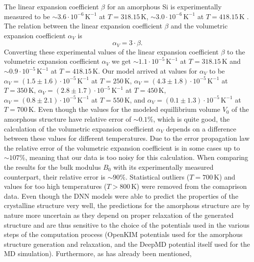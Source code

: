 The linear expansion coefficient $\beta$ for an amorphous Si is experimentally
measured to be $\sim 3.6 \cdot 10^{-6} \, \mathrm{K}^{-1}$ at
$T = 318.15 \, \mathrm{K}$, $\sim 3.0 \cdot 10^{-6} \, \mathrm{K}^{-1}$ at
$T = 418.15 \, \mathrm{K}$ \cite{TAKIMOTO2002314}. The relation between the
linear expansion coefficient $\beta$ and the volumetric expansion coefficient
$\alpha_V$ is
\begin{equation}
  \alpha_V = 3 \cdot \beta.
\end{equation}
Converting these experimental values of the linear expansion coefficient $\beta$ to the
volumetric expansion coefficient $\alpha_V$ we get
$\sim 1.1 \cdot 10^{-5} \, \mathrm{K}^{-1}$ at $T = 318.15 \, \mathrm{K}$ and
$\sim 0.9 \cdot 10^{-5} \, \mathrm{K}^{-1}$ at $T = 418.15 \, \mathrm{K}$.
Our model arrived at values for $\alpha_V$ to be
$\alpha_V = (1.5 \pm 1.6) \cdot 10^{-5} \, \mathrm{K}^{-1}$ at $T = 250 \, \mathrm{K}$,
$\alpha_V = (4.3 \pm 1.8) \cdot 10^{-5} \, \mathrm{K}^{-1}$ at $T = 350 \, \mathrm{K}$,
$\alpha_V = (2.8 \pm 1.7) \cdot 10^{-5} \, \mathrm{K}^{-1}$ at $T = 450 \, \mathrm{K}$,
$\alpha_V = (0.8 \pm 2.1) \cdot 10^{-5} \, \mathrm{K}^{-1}$ at $T = 550 \, \mathrm{K}$,
and $\alpha_V = (0.1 \pm 1.3) \cdot 10^{-5} \, \mathrm{K}^{-1}$ at $T = 700 \, \mathrm{K}$.
Even though the values for the modeled equillibrium volume $V_0$ of the
amorphous structure have relative error of $\sim 0.1 \%$, which is quite good,
the calculation of the volumetric expansion coefficient $\alpha_V$ depends on
a difference between these values for different temperatures. Due to the error
propagation law the relative error of the volumetric expansion coefficient is
in some cases up to $\sim 107 \%$, meaning that our data is too noisy for this
calculation. When comparing the results for the bulk modulus $B_0$ with its
experimentally measured counterpart, their relative error is $\sim 90 \%$.
Statistical outliers ($T = 700 \, \mathrm{K}$) and values for too high
temperatures ($T > 800 \, \mathrm{K}$) were removed from the comaprison data.
Even though the DNN models were able to predict the properties of the
crystalline structure very well, the predictions for the amorphous structure
are by nature more uncertain as they depend on proper relaxation of the
generated structure and are thus sensitive to the choice of the potentials used
in the various steps of the computation process (OpenKIM potentials used for
the amorphous structure generation and relaxation, and the DeepMD potential
itself used for the MD simulation). Furthermore, as has already been mentioned,

